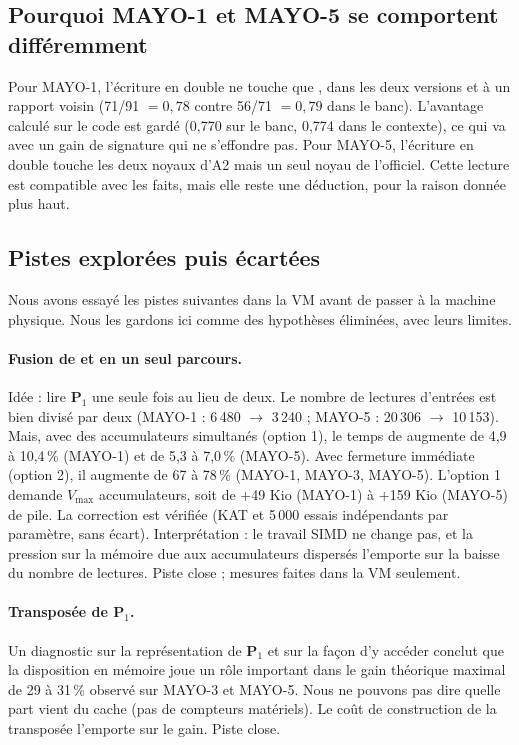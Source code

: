 \subsection{Pourquoi MAYO-1 et MAYO-5 se comportent différemment}
\I{} Pour MAYO-1, l'écriture en double ne touche que , dans les deux versions et à un rapport voisin (71/91 $=0{,}78$ contre 56/71 $=0{,}79$ dans le banc). L'avantage calculé sur le code est gardé (0,770 sur le banc, 0,774 dans le contexte), ce qui va avec un gain de signature qui ne s'effondre pas. Pour MAYO-5, l'écriture en double touche les deux noyaux d'A2 mais un seul noyau de l'officiel. Cette lecture est compatible avec les faits, mais elle reste une déduction, pour la raison donnée plus haut.

\subsection{Pistes explorées puis écartées}
Nous avons essayé les pistes suivantes dans la VM avant de passer à la machine physique. Nous les gardons ici comme des hypothèses éliminées, avec leurs limites.

\paragraph{Fusion de  et  en un seul parcours.} Idée : lire $\mathbf{P}_1$ une seule fois au lieu de deux. Le nombre de lectures d'entrées est bien divisé par deux (MAYO-1 : 6\,480 $\to$ 3\,240 ; MAYO-5 : 20\,306 $\to$ 10\,153). Mais, avec des accumulateurs simultanés (option 1), le temps de  augmente de 4,9 à 10,4\,\% (MAYO-1) et de 5,3 à 7,0\,\% (MAYO-5). Avec fermeture immédiate (option 2), il augmente de 67 à 78\,\% (MAYO-1, MAYO-3, MAYO-5). L'option 1 demande $V_{\max}$ accumulateurs, soit de +49 Kio (MAYO-1) à +159 Kio (MAYO-5) de pile. La correction est vérifiée (KAT et 5\,000 essais indépendants par paramètre, sans écart). Interprétation : le travail SIMD ne change pas, et la pression sur la mémoire due aux accumulateurs dispersés l'emporte sur la baisse du nombre de lectures. Piste close ; mesures faites dans la VM seulement.

\paragraph{Transposée de $\mathbf{P}_1$.} Un diagnostic sur la représentation de $\mathbf{P}_1$ et sur la façon d'y accéder conclut que la disposition en mémoire joue un rôle important dans le gain théorique maximal de 29 à 31\,\% observé sur MAYO-3 et MAYO-5. Nous ne pouvons pas dire quelle part vient du cache (pas de compteurs matériels). Le coût de construction de la transposée l'emporte sur le gain. Piste close.

